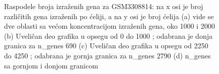 \documentclass{article}
\begin{document}
\begin{figure}[!h]
    \centering
    \caption{ Raspodele broja izraženih gena za GSM3308814: na x osi je broj različitih gena izraženih po ćeliji, a na y osi je broj ćelija (a) vide se dve oblasti sa većom koncentracijom izraženih gena, oko 1000 i 2000 (b) Uveličan deo grafika u opsegu od 0 do 1000 ; odabrana je donja granica za n\_genes 690 (c) Uveličan deo grafika u opsegu od 2250 do 4250 ; odabrana je gornja granica za n\_genes 2790 (d) n\_genes sa gornjom i donjom granicom }
    \label{fig:n_genes_GSM3308814_hist_qc}
\end{figure}
\end{document}
